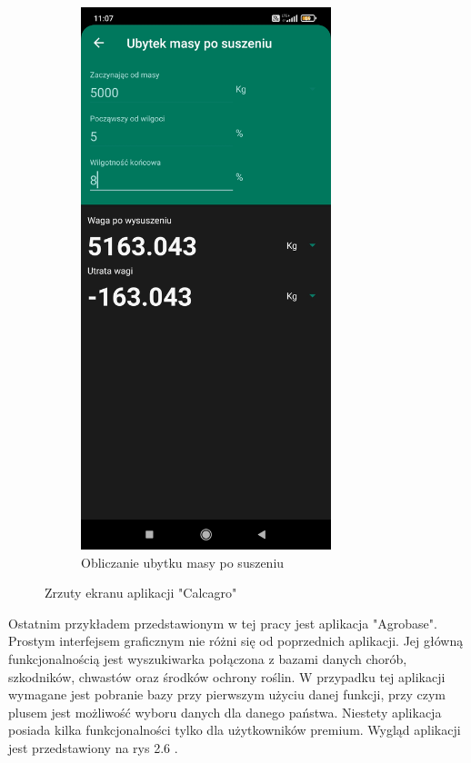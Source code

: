 \documentclass[a4paper,12pt,oneside]{book}
\begin{document}
\begin{figure}[H]
\begin{subfigure}{.5\textwidth}
			\includegraphics[width=0.8\textwidth]{grafika/calc_1.jpg}
			\caption{Obliczanie ubytku masy po suszeniu}
		\end{subfigure}
		\caption{Zrzuty ekranu aplikacji "Calcagro"}
	\end{figure}
	
	Ostatnim przykładem przedstawionym w tej pracy jest aplikacja "Agrobase". Prostym interfejsem graficznym nie różni się od poprzednich aplikacji. Jej główną funkcjonalnością jest wyszukiwarka połączona z bazami danych chorób, szkodników, chwastów oraz środków ochrony roślin. W przypadku tej aplikacji wymagane jest pobranie bazy przy pierwszym użyciu danej funkcji, przy czym plusem jest możliwość wyboru danych dla danego państwa. Niestety aplikacja posiada kilka funkcjonalności tylko dla użytkowników premium. Wygląd aplikacji jest przedstawiony na rys 2.6 .
	
\end{document}
